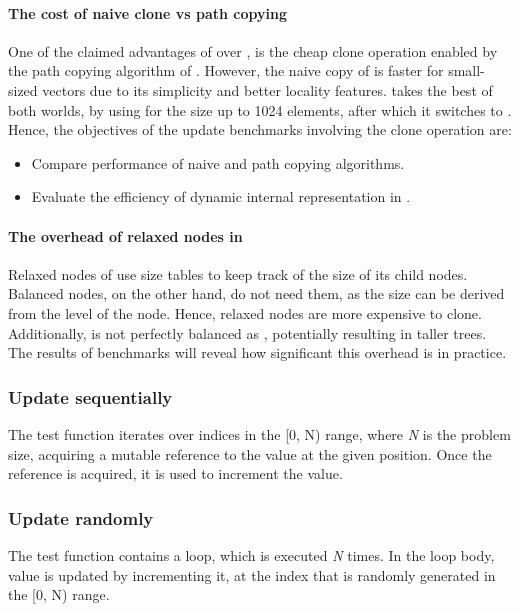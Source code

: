 \paragraph*{The cost of naive clone vs path copying}
One of the claimed advantages of \rbvec{} over \stdvec{}, is the cheap clone operation enabled by the path copying  algorithm of \rbtree{}. However, the naive copy of \stdvec{} is faster for small-sized vectors due to its simplicity and better locality features. \pvec{} takes the best of both worlds, by using \stdvec{} for the size up to 1024 elements, after which it switches to \rbvec{}. Hence, the objectives of the update benchmarks involving the clone operation are:
\begin{itemize}
    \item Compare performance of naive and path copying algorithms. 
    \item Evaluate the efficiency of dynamic internal representation in \pvec{}.  
\end{itemize}

\paragraph*{The overhead of relaxed nodes in \rrbtree{}}
Relaxed nodes of \rrbtree{} use size tables to keep track of the size of its child nodes. Balanced nodes, on the other hand, do not need them, as the size can be derived from the level of the node. Hence, relaxed nodes are more expensive to clone. Additionally, \rrbtree{} is not perfectly balanced as \rbtree{}, potentially resulting in taller trees. The results of benchmarks will reveal how significant this overhead is in practice. 

\subsubsection*{Update sequentially}
The test function iterates over indices in the [0, N) range, where \emph{N} is the problem size, acquiring a mutable reference to the value at the given position. Once the reference is acquired, it is used to increment the value. 

\subsubsection*{Update randomly}
The test function contains a loop, which is executed \emph{N} times. In the loop body, value is updated by incrementing it, at the index that is randomly generated in the [0, N) range. 

